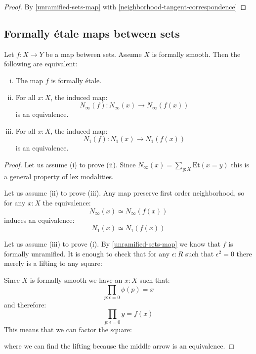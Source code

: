 \begin{proof}
By \cref{unramified-sets-map} with \cref{neighborhood-tangent-correspondence}
\end{proof}

\subsection{Formally étale maps between sets}

\begin{proposition}\label{etale-sets-map}
Let $f:X\to Y$ be a map between sets. Assume $X$ is formally smooth. Then the following are equivalent:
\begin{enumerate}[(i)]
\item The map $f$ is formally étale. 
\item For all $x:X$, the induced map:
\[N_\infty(f) : N_\infty(x)\to N_\infty(f(x))\]
is an equivalence.
\item For all $x:X$, the induced map:
\[N_1(f) : N_1(x)\to N_1(f(x))\]
is an equivalence.
\end{enumerate}
\end{proposition}

\begin{proof}
Let us assume (i) to prove (ii). Since $N_\infty(x) = \sum_{y:X}\mathrm{Et}(x=y)$ this is a general property of lex modalities.

Let us assume (ii) to prove (iii). Any map preserve first order neighborhood, so for any $x:X$ the equivalence:
\[N_\infty(x)\simeq N_\infty(f(x))\]
induces an equivalence:
\[N_1(x)\simeq N_1(f(x))\]

Let us assume (iii) to prove (i). By \cref{unramified-sets-map} we know that $f$ is formally unramified. It is enough to check that for any $\epsilon:R$ such that $\epsilon^2=0$ there merely is a lifting to any square:
 \begin{center}
    \end{center}
Since $X$ is formally smooth we have an $x:X$ such that:
\[\prod_{p:\epsilon=0} \phi(p)=x\]
and therefore:
\[\prod_{p:\epsilon=0} y=f(x)\]
This means that we can factor the square:
 \begin{center}
    \end{center}
    where we can find the lifting because the middle arrow is an equivalence.
\end{proof}

